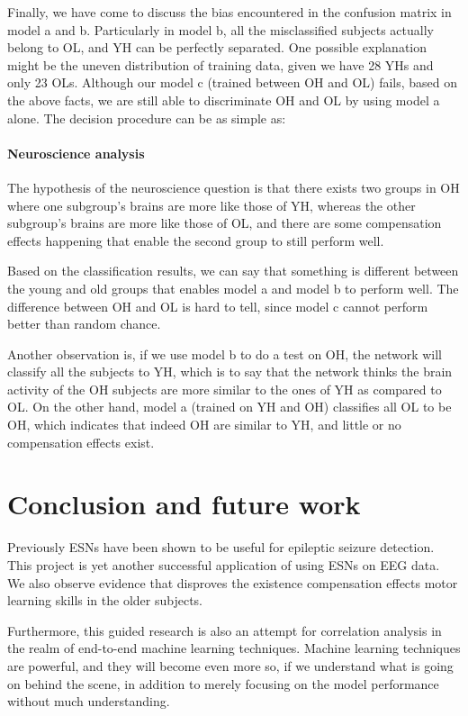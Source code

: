 \documentclass[a4paper,11pt,oneside]{article}
\begin{document}
Finally, we have come to discuss the bias encountered in the confusion matrix in model a and b. Particularly in model b, all the misclassified subjects actually belong to OL, and YH can be perfectly separated. One possible explanation might be the uneven distribution of training data, given we have 28 YHs and only 23 OLs. Although our model c (trained between OH and OL) fails, based on the above facts, we are still able to discriminate OH and OL by using model a alone. The decision procedure can be as simple as: 


\paragraph{Neuroscience analysis}
The hypothesis of the neuroscience question is that there exists two groups in OH where one subgroup's brains are more like those of YH, whereas the other subgroup's brains are more like those of OL, and there are some compensation effects happening that enable the second group to still perform well. 

Based on the classification results, we can say that something is different between the young and old groups that enables model a and model b to perform well. The difference between OH and OL is hard to tell, since model c cannot perform better than random chance. 

Another observation is, if we use model b to do a test on OH, the network will classify all the subjects to YH, which is to say that the network thinks the brain activity of the OH subjects are more similar to the ones of YH as compared to OL. On the other hand, model a (trained on YH and OH) classifies all OL to be OH, which indicates that indeed OH are similar to YH, and little or no compensation effects exist. 

\section{Conclusion and future work}
Previously ESNs have been shown to be useful for epileptic seizure detection. This project is yet another successful application of using ESNs on EEG data. We also observe evidence that disproves the existence  compensation effects motor learning skills in the older subjects.

Furthermore, this guided research is also an attempt for correlation analysis in the realm of end-to-end machine learning techniques. Machine learning techniques are powerful, and they will become even more so, if we understand what is going on behind the scene, in addition to merely focusing on the model performance without much understanding. 
\end{document}

